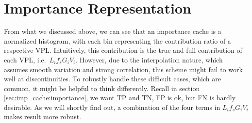 \documentclass[]{book}
\begin{document}
\section{Importance Representation}
\label{sec:imp_cache:represent}
From what we discussed above, we can see that an importance cache is a normalized histogram, with each bin representing the contribution ratio of a respective VPL.
Intuitively, this contribution is the true and full contribution of each VPL, i.e.\ $L_i f_s G_i V_i$.
However, due to the interpolation nature, which assumes smooth variation and strong correlation, this scheme might fail to work well at discontinuities.
To robustly handle these difficult cases, which are common, it might be helpful to think differently.
Recall in section \ref{sec:imp_cache:importance}, we want TP and TN, FP is ok, but FN is hardly desirable.
As we will shortly find out, a combination of the four terms in $L_i f_s G_i V_i$ makes result more robust.
\end{document}
